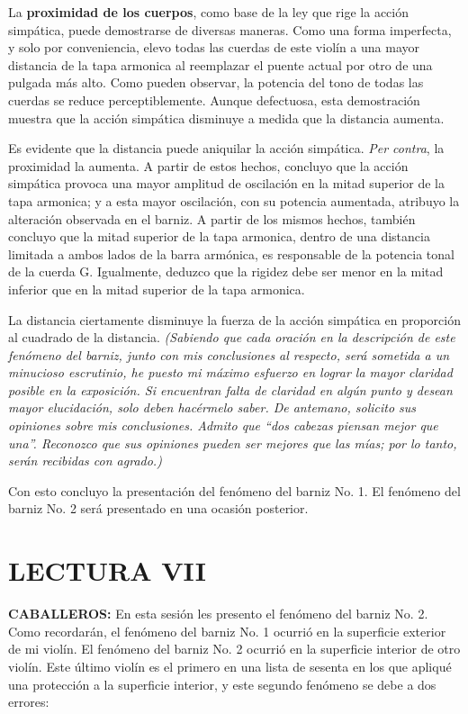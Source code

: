 \documentclass[12pt]{book}
\begin{document}
La \textbf{proximidad de los cuerpos}, como base de la ley que rige la acción simpática, puede demostrarse de diversas maneras. Como una forma imperfecta, y solo por conveniencia, elevo todas las cuerdas de este violín a una mayor distancia de la tapa armonica al reemplazar el puente actual por otro de una pulgada más alto. Como pueden observar, la potencia del tono de todas las cuerdas se reduce perceptiblemente. Aunque defectuosa, esta demostración muestra que la acción simpática disminuye a medida que la distancia aumenta.

Es evidente que la distancia puede aniquilar la acción simpática. \textit{Per contra}, la proximidad la aumenta. A partir de estos hechos, concluyo que la acción simpática provoca una mayor amplitud de oscilación en la mitad superior de la tapa armonica; y a esta mayor oscilación, con su potencia aumentada, atribuyo la alteración observada en el barniz. A partir de los mismos hechos, también concluyo que la mitad superior de la tapa armonica, dentro de una distancia limitada a ambos lados de la barra armónica, es responsable de la potencia tonal de la cuerda G. Igualmente, deduzco que la rigidez debe ser menor en la mitad inferior que en la mitad superior de la tapa armonica. 

La distancia ciertamente disminuye la fuerza de la acción simpática en proporción al cuadrado de la distancia. \textit{(Sabiendo que cada oración en la descripción de este fenómeno del barniz, junto con mis conclusiones al respecto, será sometida a un minucioso escrutinio, he puesto mi máximo esfuerzo en lograr la mayor claridad posible en la exposición. Si encuentran falta de claridad en algún punto y desean mayor elucidación, solo deben hacérmelo saber. De antemano, solicito sus opiniones sobre mis conclusiones. Admito que ``dos cabezas piensan mejor que una''. Reconozco que sus opiniones pueden ser mejores que las mías; por lo tanto, serán recibidas con agrado.)}

Con esto concluyo la presentación del fenómeno del barniz No. 1. El fenómeno del barniz No. 2 será presentado en una ocasión posterior.

\section*{LECTURA VII}

\textbf{CABALLEROS:} En esta sesión les presento el fenómeno del barniz No. 2. Como recordarán, el fenómeno del barniz No. 1 ocurrió en la superficie exterior de mi violín. El fenómeno del barniz No. 2 ocurrió en la superficie interior de otro violín. Este último violín es el primero en una lista de sesenta en los que apliqué una protección a la superficie interior, y este segundo fenómeno se debe a dos errores:
\end{document}
